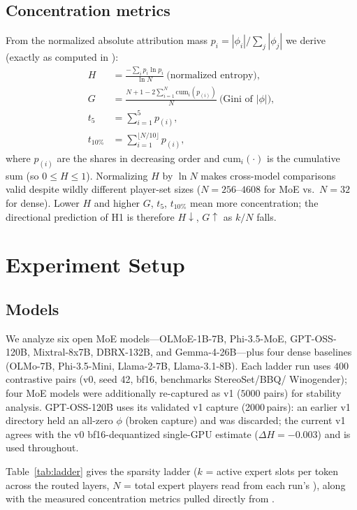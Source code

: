 \documentclass[sigconf]{acmart}
\begin{document}
\subsection{Concentration metrics}
From the normalized absolute attribution mass
$p_i = |\phi_i| / \allowbreak \sum_j |\phi_j|$ we derive (exactly as computed in
):
\begin{align}
 H &= \frac{-\sum_i p_i \ln p_i}{\ln N}
      \ \text{(normalized entropy)},\\
 G &= \frac{N+1 - 2 \sum_{i=1}^{N} \mathrm{cum}_i(p_{(i)})}{N}
      \ \text{(Gini of } |\phi| \text{)},\\
  t_5 &= \sum_{i=1}^{5} p_{(i)},\\
  t_{10\%} &= \sum_{i=1}^{\lfloor N/10 \rfloor} p_{(i)} ,
\end{align}
where $p_{(i)}$ are the shares in decreasing order and
$\mathrm{cum}_i(\cdot)$ is the cumulative sum (so $0 \le H \le 1$).
Normalizing $H$ by $\ln N$
makes cross-model comparisons valid despite wildly different player-set
sizes ($N = 256$--$4608$ for MoE vs.\ $N = 32$ for dense). Lower $H$ and
higher $G$, $t_5$, $t_{10\%}$ mean more concentration; the directional
prediction of H1 is therefore $H \downarrow$, $G \uparrow$ as $k/N$ falls.

\section{Experiment Setup}
\label{sec:setup}
\subsection{Models}
We analyze six open MoE models---OLMoE-1B-7B, Phi-3.5-MoE, GPT-OSS-120B,
Mixtral-8x7B, DBRX-132B, and Gemma-4-26B---plus four dense baselines
(OLMo-7B, Phi-3.5-Mini, Llama-2-7B, Llama-3.1-8B). Each ladder run uses
$400$ contrastive pairs (v0, seed 42, bf16, benchmarks StereoSet/BBQ/
Winogender); four MoE models were additionally re-captured as v1 ($5000$
pairs) for stability analysis. GPT-OSS-120B uses its validated v1 capture
(2000\,pairs): an earlier v1 directory held an all-zero $\phi$ (broken
capture) and was discarded; the current v1 agrees with the v0
bf16-dequantized single-GPU estimate ($\Delta H = -0.003$) and is used
throughout.

Table~\ref{tab:ladder} gives the sparsity ladder ($k$ = active expert slots
per token across the routed layers, $N$ = total expert players read from
each run's ), along with the
measured concentration metrics pulled directly from
.
\end{document}
